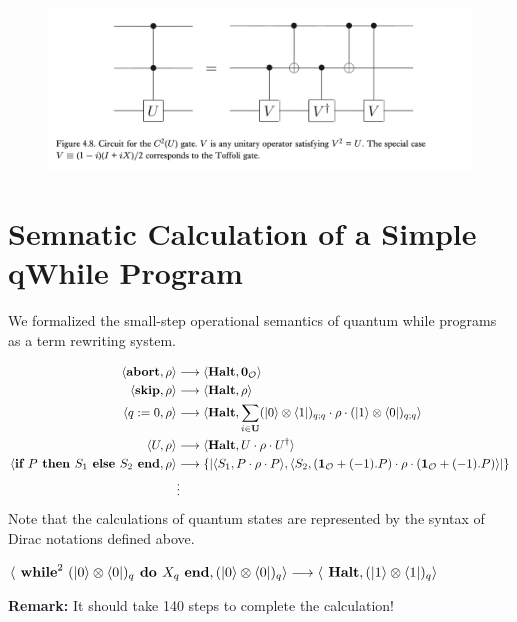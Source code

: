 \documentclass[manuscript, review, timestamp]{acmart}
\begin{document}
\begin{figure}[h]
  \includegraphics*[width=\textwidth]{QCQI.Fig4.8.png}
\end{figure}




\section{Semnatic Calculation of a Simple qWhile Program}
We formalized the small-step operational semantics of quantum while programs as a term rewriting system.
\begin{definition}
  \begin{align*}
    \langle \textbf{abort}, \rho \rangle &\longrightarrow \langle \textbf{Halt}, \textbf{0}_\mathcal{O} \rangle \\
    \langle \textbf{skip}, \rho \rangle &\longrightarrow \langle \textbf{Halt}, \rho \rangle \\
    \langle q :=0, \rho \rangle &\longrightarrow \langle \textbf{Halt}, \sum_{i \in \textbf{U}} (\ket{0}\otimes\bra{1})_{q;q} \cdot \rho \cdot (\ket{1}\otimes\bra{0})_{q;q} \rangle \\
    \langle U, \rho \rangle & \longrightarrow \langle \textbf{Halt}, U \cdot \rho \cdot U^\dagger \rangle \\
    \langle \textbf{if } P \textbf{ then } S_1 \textbf{ else } S_2 \textbf{ end}, \rho \rangle &\longrightarrow \{| \langle S_1, P \cdot \rho \cdot P \rangle, \langle S_2, (\mathbf{1}_\mathcal{O} + (-1).P) \cdot \rho \cdot (\mathbf{1}_\mathcal{O} + (-1).P)\rangle |\} \\
     & \vdots
  \end{align*}
  Note that the calculations of quantum states are represented by the syntax of Dirac notations defined above.
\end{definition}

\begin{example}
  $\langle \textbf{ while}^2\ (\ket{0}\otimes\bra{0})_q \textbf{ do } X_q\ \textbf{end}, (\ket{0}\otimes\bra{0})_q \rangle \longrightarrow \langle \textbf{ Halt}, (\ket{1}\otimes\bra{1})_q \rangle$
\end{example}

\textbf{Remark:} It should take 140 steps to complete the calculation!




\end{document}
